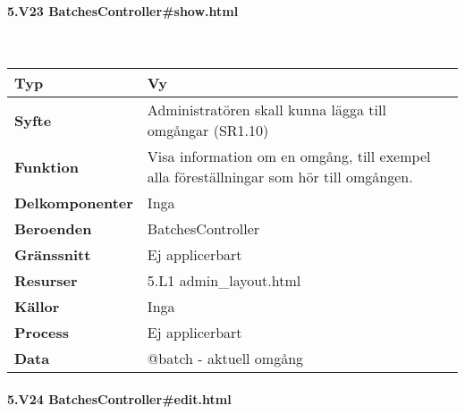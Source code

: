 \documentclass[a4paper, twoside, 11pt, titlepage]{article}
\begin{document}
			\paragraph{5.V23 BatchesController\#show.html}\

			\begin {table} [ht] \begin{tabular} {  p{3.5cm} p{11.6cm} }
				\hline
				{\sffamily\textbf{Typ}} & {Vy} \\
				\hline
				{\sffamily\textbf{Syfte}} & {Administratören skall kunna lägga till omgångar (SR1.10)} \\
				\hline
				{\sffamily\textbf{Funktion}} & {Visa information om en omgång, till exempel alla föreställningar som hör till omgången.} \\
				\hline
				{\sffamily\textbf{Delkomponenter}} & {Inga} \\
				\hline
				{\sffamily\textbf{Beroenden}} & {BatchesController} \\
				\hline
				{\sffamily\textbf{Gränssnitt}} & {Ej applicerbart} \\
				\hline
				{\sffamily\textbf{Resurser}} & {5.L1 admin\_layout.html} \\
				\hline
				{\sffamily\textbf{Källor}} & {Inga} \\
				\hline
				{\sffamily\textbf{Process}} & {Ej applicerbart} \\
				\hline
				{\sffamily\textbf{Data}} & {@batch - aktuell omgång} \\
				\hline
			\end{tabular} \end{table} \FloatBarrier


			\paragraph{5.V24 BatchesController\#edit.html}\
\end{document}
